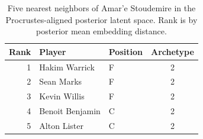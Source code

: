 \begin{table}[htbp]
  \centering\small
  \begin{tabular}{rllc}
    \toprule
    Rank & Player & Position & Archetype \\
    \midrule
    1 & Hakim Warrick & F & 2 \\
    2 & Sean Marks & F & 2 \\
    3 & Kevin Willis & F & 2 \\
    4 & Benoit Benjamin & C & 2 \\
    5 & Alton Lister & C & 2 \\
    \bottomrule
  \end{tabular}
  \caption{Five nearest neighbors of Amar'e Stoudemire in the Procrustes-aligned posterior latent space. Rank is by posterior mean embedding distance.}
  \label{tab:Amar_e_Stoudemire_neighbors}
\end{table}

